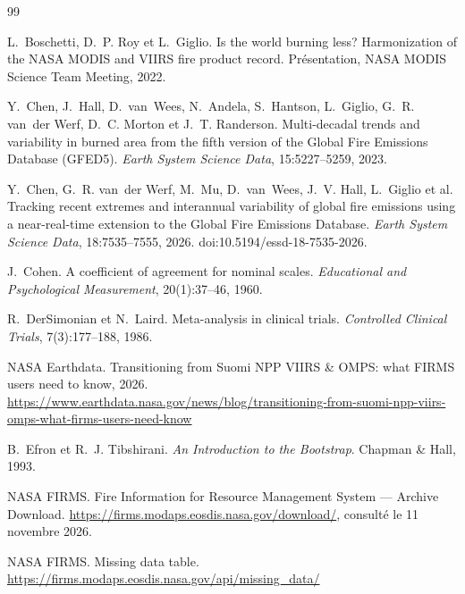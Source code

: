 \documentclass[11pt,a4paper]{article}
\begin{document}
\begin{thebibliography}{99}
\small

L.~Boschetti, D.~P. Roy et L.~Giglio.
\newblock Is the world burning less? Harmonization of the NASA MODIS and VIIRS fire product record.
\newblock Présentation, NASA MODIS Science Team Meeting, 2022.

Y.~Chen, J.~Hall, D.~van~Wees, N.~Andela, S.~Hantson, L.~Giglio, G.~R. van~der Werf, D.~C. Morton et J.~T. Randerson.
\newblock Multi-decadal trends and variability in burned area from the fifth version of the Global Fire Emissions Database (GFED5).
\newblock \emph{Earth System Science Data}, 15:5227--5259, 2023.

Y.~Chen, G.~R. van~der Werf, M.~Mu, D.~van~Wees, J.~V. Hall, L.~Giglio et al.
\newblock Tracking recent extremes and interannual variability of global fire emissions using a near-real-time extension to the Global Fire Emissions Database.
\newblock \emph{Earth System Science Data}, 18:7535--7555, 2026. doi:10.5194/essd-18-7535-2026.

J.~Cohen.
\newblock A coefficient of agreement for nominal scales.
\newblock \emph{Educational and Psychological Measurement}, 20(1):37--46, 1960.

R.~DerSimonian et N.~Laird.
\newblock Meta-analysis in clinical trials.
\newblock \emph{Controlled Clinical Trials}, 7(3):177--188, 1986.

NASA Earthdata.
\newblock Transitioning from Suomi NPP VIIRS \& OMPS: what FIRMS users need to know, 2026.
\newblock \url{https://www.earthdata.nasa.gov/news/blog/transitioning-from-suomi-npp-viirs-omps-what-firms-users-need-know}

B.~Efron et R.~J. Tibshirani.
\newblock \emph{An Introduction to the Bootstrap}.
\newblock Chapman \& Hall, 1993.

NASA FIRMS.
\newblock Fire Information for Resource Management System --- Archive Download.
\newblock \url{https://firms.modaps.eosdis.nasa.gov/download/}, consulté le 11 novembre 2026.

NASA FIRMS.
\newblock Missing data table.
\newblock \url{https://firms.modaps.eosdis.nasa.gov/api/missing_data/}


\end{thebibliography}
\end{document}
